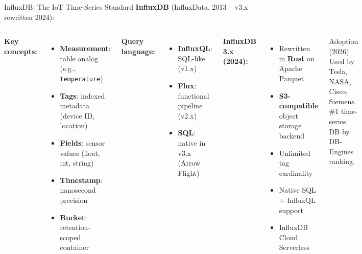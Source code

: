 \documentclass[aspectratio=169,11pt]{beamer}
\begin{document}
\begin{frame}{InfluxDB: The IoT Time-Series Standard}
    \small
    \textbf{InfluxDB} (InfluxData, 2013 -- v3.x rewritten 2024):

    \vspace{0.05cm}
    \begin{columns}
        \textbf{Key concepts:}
        \begin{itemize}\setlength{\itemsep}{0pt}
            \item \textbf{Measurement}: table analog (e.g., \texttt{temperature})
            \item \textbf{Tags}: indexed metadata (device ID, location)
            \item \textbf{Fields}: sensor values (float, int, string)
            \item \textbf{Timestamp}: nanosecond precision
            \item \textbf{Bucket}: retention-scoped container
        \end{itemize}

        \vspace{0.05cm}
        \textbf{Query language:}
        \begin{itemize}\setlength{\itemsep}{0pt}
            \item \textbf{InfluxQL}: SQL-like (v1.x)
            \item \textbf{Flux}: functional pipeline (v2.x)
            \item \textbf{SQL}: native in v3.x (Arrow Flight)
        \end{itemize}

        \textbf{InfluxDB 3.x (2024):}
        \begin{itemize}\setlength{\itemsep}{0pt}
            \item Rewritten in \textbf{Rust} on Apache Parquet
            \item \textbf{S3-compatible} object storage backend
            \item Unlimited tag cardinality
            \item Native SQL + InfluxQL support
            \item InfluxDB Cloud Serverless
        \end{itemize}

        \vspace{0.05cm}
        \begin{alertblock}{Adoption (2026)}
            Used by Tesla, NASA, Cisco, Siemens. \#1 time-series DB by DB-Engines ranking.
        \end{alertblock}
    \end{columns}
\end{frame}
\end{document}

